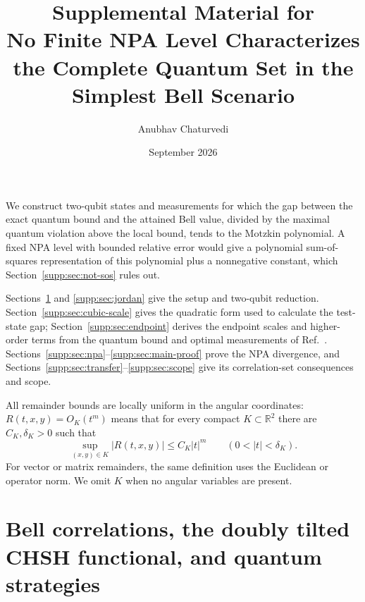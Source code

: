 \documentclass[aps,prl,onecolumn,10pt,superscriptaddress,nofootinbib,longbibliography]{revtex4-2}
\theoremstyle{remark}
\newcommand{\R}{\mathbb R}
\begin{document}
\title{Supplemental Material for\\ No Finite NPA Level Characterizes the Complete Quantum Set in the Simplest Bell Scenario}
\author{Anubhav Chaturvedi}
\date{September 2026}
\maketitle
\setcounter{secnumdepth}{3}
\renewcommand{\thesection}{S\arabic{section}}
\renewcommand{\thesubsection}{\thesection.\arabic{subsection}}
\makeatletter
\def\p@subsection{}
\makeatother
\renewcommand{\theequation}{S\arabic{equation}}
\renewcommand{\thetheorem}{S\arabic{theorem}}
We construct two-qubit states and measurements for which the gap between the exact quantum bound and the attained Bell value, divided by the maximal quantum violation above the local bound, tends to the Motzkin polynomial. A fixed NPA level with bounded relative error would give a polynomial sum-of-squares representation of this polynomial plus a nonnegative constant, which Section~\ref{supp:sec:not-sos} rules out.

Sections~\ref{supp:sec:bell} and \ref{supp:sec:jordan} give the setup and two-qubit reduction. Section~\ref{supp:sec:cubic-scale} gives the quadratic form used to calculate the test-state gap; Section~\ref{supp:sec:endpoint} derives the endpoint scales and higher-order terms from the quantum bound and optimal measurements of Ref.~\cite{GigenaEtAl2025}. Sections~\ref{supp:sec:npa}--\ref{supp:sec:main-proof} prove the NPA divergence, and Sections~\ref{supp:sec:transfer}--\ref{supp:sec:scope} give its correlation-set consequences and scope.

All remainder bounds are locally uniform in the angular coordinates: $R(t,x,y)=O_K(t^m)$ means that for every compact $K\subset\R^2$ there are $C_K,\delta_K>0$ such that
\begin{equation}
\sup_{(x,y)\in K}|R(t,x,y)|\leq C_K|t|^m
\qquad (0<|t|<\delta_K).
\label{supp:eq:uniform-big-O-definition}
\end{equation}
For vector or matrix remainders, the same definition uses the Euclidean or operator norm. We omit $K$ when no angular variables are present.

\section{Bell correlations, the doubly tilted CHSH functional, and quantum strategies}
\label{supp:sec:bell}
\end{document}
